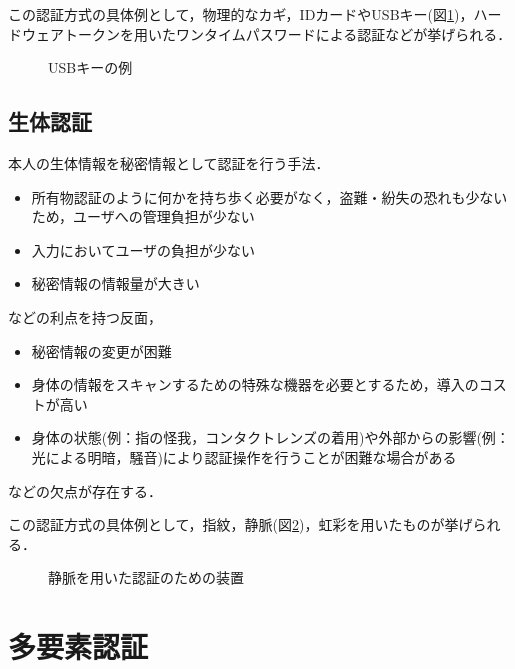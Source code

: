 この認証方式の具体例として，物理的なカギ，IDカードやUSBキー(図\ref{fig:dongle})，ハードウェアトークンを用いたワンタイムパスワードによる認証などが挙げられる．

\begin{figure}[th]
\begin{center}
\end{center}
\caption{USBキーの例}
\label{fig:dongle}
\end{figure}


\subsection{生体認証}\label{subsec:inherence}
本人の生体情報を秘密情報として認証を行う手法．

\begin{itemize}
\item 所有物認証のように何かを持ち歩く必要がなく，盗難・紛失の恐れも少ないため，ユーザへの管理負担が少ない
\item 入力においてユーザの負担が少ない
\item 秘密情報の情報量が大きい
\end{itemize}
などの利点を持つ反面，
\begin{itemize}
\item 秘密情報の変更が困難
\item 身体の情報をスキャンするための特殊な機器を必要とするため，導入のコストが高い
\item 身体の状態(例：指の怪我，コンタクトレンズの着用)や外部からの影響(例：光による明暗，騒音)により認証操作を行うことが困難な場合がある
\end{itemize}
などの欠点が存在する\cite{kasperskyBio}．

この認証方式の具体例として，指紋，静脈(図\ref{fig:veinAuth})，虹彩を用いたものが挙げられる．

\begin{figure}[th]
\begin{center}
\end{center}
\caption{静脈を用いた認証のための装置}
\label{fig:veinAuth}
\end{figure}

\section{多要素認証}\label{sec:2factor}


